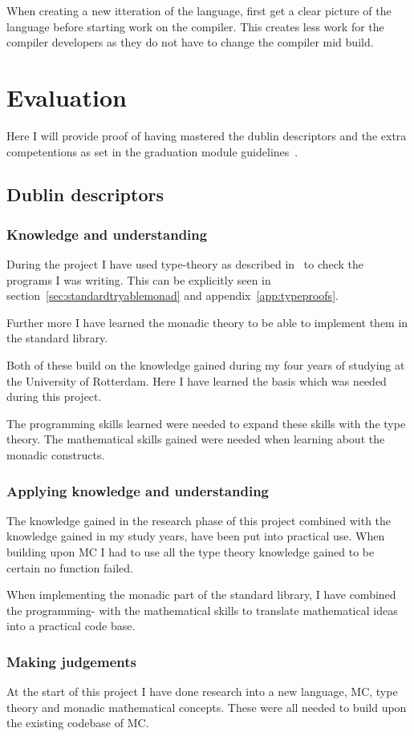 When creating a new itteration of the language, first get a clear picture of the language before starting work on the compiler.
This creates less work for the compiler developers as they do not have to change the compiler mid build.


\chapter{Evaluation}
Here I will provide proof of having mastered the dublin descriptors and the extra competentions as set in the graduation module guidelines~\cite{}.

\section{Dublin descriptors}
\subsection{Knowledge and understanding}
During the project I have used type-theory as described in~\cite{} to check the programs I was writing.
This can be explicitly seen in section~\ref{sec:standardtryablemonad} and appendix~\ref{app:typeproofs}.

Further more I have learned the monadic theory to be able to implement them in the standard library.

Both of these build on the knowledge gained during my four years of studying at the University of Rotterdam.
Here I have learned the basis which was needed during this project.

The programming skills learned were needed to expand these skills with the type theory.
The mathematical skills gained were needed when learning about the monadic constructs.


\subsection{Applying knowledge and understanding}
The knowledge gained in the research phase of this project combined with the knowledge gained in my study years, have been put into practical use.
When building upon MC I had to use all the type theory knowledge gained to be certain no function failed.

When implementing the monadic part of the standard library, I have combined the programming- with the mathematical skills to translate mathematical ideas into a practical code base.


\subsection{Making judgements}
At the start of this project I have done research into a new language, MC, type theory and monadic mathematical concepts.
These were all needed to build upon the existing codebase of MC.

